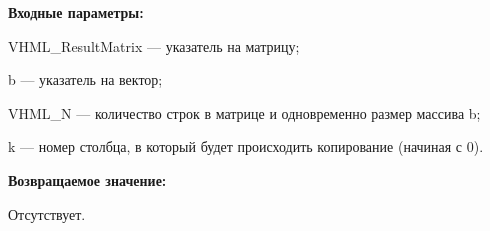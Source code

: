 \textbf{Входные параметры:}  
 
VHML\_ResultMatrix --- указатель на матрицу;
 
b --- указатель на вектор;
 
VHML\_N --- количество строк в матрице и одновременно размер массива b;
 
k --- номер столбца, в который будет происходить копирование (начиная с 0).

\textbf{Возвращаемое значение:}

Отсутствует.